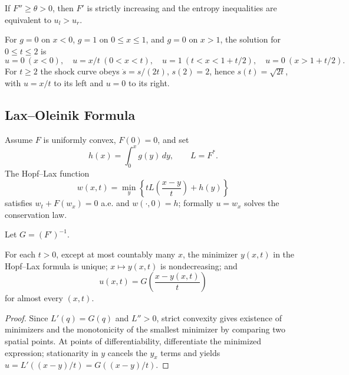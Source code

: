 \begin{remark}
\label{rem:entropy-condition-uniform-convexity}

If $F''\ge\theta>0$, then $F'$ is strictly increasing and the entropy
inequalities are equivalent to $u_l>u_r$.
\end{remark}

\begin{example}
\label{ex:burgers-triangular-shock-wave}

For $g=0$ on $x<0$, $g=1$ on $0\le x\le1$, and $g=0$ on $x>1$, the
solution for $0\le t\le2$ is
\[
u=0\ (x<0),\quad u=x/t\ (0<x<t),\quad u=1\ (t<x<1+t/2),
\quad u=0\ (x>1+t/2).
\]
For $t\ge2$ the shock curve obeys
$\dot s=s/(2t)$, $s(2)=2$, hence $s(t)=\sqrt{2t}$, with $u=x/t$ to its
left and $u=0$ to its right.
\end{example}

\subsection{Lax--Oleinik Formula}
\label{sec:lax-oleinik-formula}

Assume $F$ is uniformly convex, $F(0)=0$, and set
\[
h(x)=\int_0^xg(y)\,dy,\qquad L=F^*.
\]
The Hopf--Lax function
\[
w(x,t)=\min_y\left\{tL\left(\frac{x-y}{t}\right)+h(y)\right\}
\]
satisfies $w_t+F(w_x)=0$ a.e. and $w(\cdot,0)=h$; formally $u=w_x$ solves
the conservation law.

Let $G=(F')^{-1}$.

\begin{theorem}
\label{thm:lax-oleinik-formula}

For each $t>0$, except at most countably many $x$, the minimizer $y(x,t)$
in the Hopf--Lax formula is unique; $x\mapsto y(x,t)$ is nondecreasing; and
\[
u(x,t)=G\left(\frac{x-y(x,t)}{t}\right)
\]
for almost every $(x,t)$.
\end{theorem}

\begin{proof}
\sketch Since $L'(q)=G(q)$ and $L''>0$, strict convexity gives existence of
minimizers and the monotonicity of the smallest minimizer by comparing two
spatial points. At points of differentiability, differentiate the minimized
expression; stationarity in $y$ cancels the $y_x$ terms and yields
$u=L'((x-y)/t)=G((x-y)/t)$.
\end{proof}

